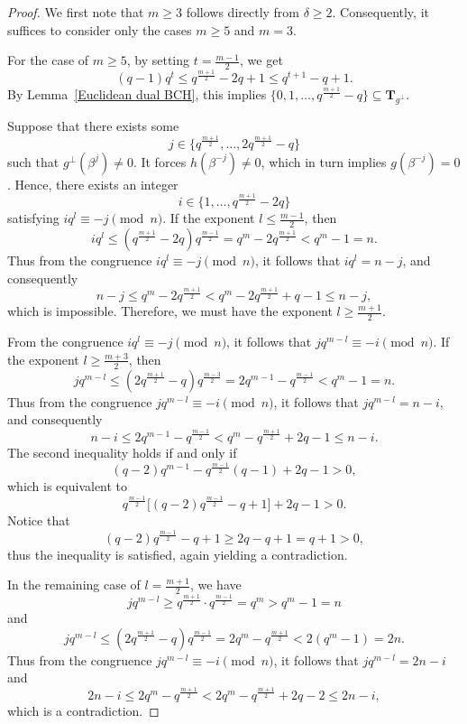 \documentclass[10pt,a4paper]{amsart}
\begin{document}
\begin{proof}
	We first note that $m \ge 3$ follows directly from $\delta \ge 2$. Consequently, it suffices to consider only the cases $m\ge 5$ and $m=3$.
	
	For the case of $m\ge 5$, by setting $t = \frac{m-1}{2}$, we get
	\[
	(q-1)q^t \le q^{\frac{m+1}{2}} - 2q + 1 \le q^{t+1} - q + 1.
	\]
	By Lemma~\ref{Euclidean dual BCH}, this implies
	\(
	\{0,1,\dots,q^{\frac{m+1}{2}} - q\} \subseteq \mathbf{T}_{g^\perp}.
	\)
	
	Suppose that there exists some
	\[
	j \in \{q^{\frac{m+1}{2}}, \dots, 2q^{\frac{m+1}{2}} - q\}
	\]
	such that $g^\perp(\beta^j) \ne 0$. It forces $h(\beta^{-j}) \ne 0$, which in turn implies $g(\beta^{-j}) = 0$. Hence, there exists an integer
	\[
	i \in \{1, \dots, q^{\frac{m+1}{2}} - 2q\}
	\]
	satisfying
	\(
	i q^l \equiv -j \pmod{n}
	\). If the exponent $l \le \frac{m-1}{2}$, then
	\[
	i q^l \le (q^{\frac{m+1}{2}} - 2q) q^{\frac{m-1}{2}}
	= q^m - 2q^{\frac{m+1}{2}}
	< q^m - 1 = n.
	\]
	Thus from the congruence $i q^l\equiv -j \pmod n$, it follows that $i q^l = n - j$, and consequently
	\[
	n - j \le q^m - 2q^{\frac{m+1}{2}}
	< q^m - 2q^{\frac{m+1}{2}} + q - 1
	\le n - j,
	\]
	which is impossible. Therefore, we must have the exponent $l \ge \frac{m+1}{2}$.
	
	From the congruence $i q^l \equiv -j \pmod{n}$, it follows that
	\(
	j q^{m-l} \equiv -i \pmod{n}.
	\)
	If the exponent $l \ge \frac{m+3}{2}$, then
	\[
	j q^{m-l} \le (2q^{\frac{m+1}{2}} - q) q^{\frac{m-3}{2}}
	= 2q^{m-1} - q^{\frac{m-1}{2}}
	< q^m - 1 = n.
	\]
	Thus from the congruence $j q^{m-l} \equiv -i \pmod{n}$, it follows that $j q^{m-l} = n - i$, and consequently
	\[
	n - i \le 2q^{m-1} - q^{\frac{m-1}{2}}
	< q^m - q^{\frac{m+1}{2}} + 2q - 1
	\le n - i.
	\]
	The second inequality holds if and only if
	\[
	(q-2)q^{m-1} - q^{\frac{m-1}{2}}(q-1) + 2q - 1 > 0,
	\]
	which is equivalent to
	\[
	q^{\frac{m-1}{2}} \big[(q-2)q^{\frac{m-1}{2}} - q + 1\big] + 2q - 1 > 0.
	\]
	Notice that
	\[
	(q-2)q^{\frac{m-1}{2}} - q + 1 \ge 2q - q + 1 = q + 1 > 0,
	\]
	thus the inequality is satisfied, again yielding a contradiction.
	
	In the remaining case of $l=\frac{m+1}{2}$, we have
	\[
	j q^{m-l} \ge q^{\frac{m+1}{2}} \cdot q^{\frac{m-1}{2}} = q^m > q^m - 1 = n
	\]
	and
	\[
	j q^{m-l} \le (2q^{\frac{m+1}{2}} - q) q^{\frac{m-1}{2}}
	= 2q^m - q^{\frac{m+1}{2}}
	< 2(q^m - 1) = 2n.
	\]
	Thus from the congruence $j q^{m-l} \equiv -i \pmod{n}$, it follows that $j q^{m-l} = 2n - i$ and
	\[
	2n - i \le 2q^m - q^{\frac{m+1}{2}}
	< 2q^m - q^{\frac{m+1}{2}} + 2q - 2
	\le 2n - i,
	\]
	which is a contradiction.
	

\end{proof}
\end{document}
